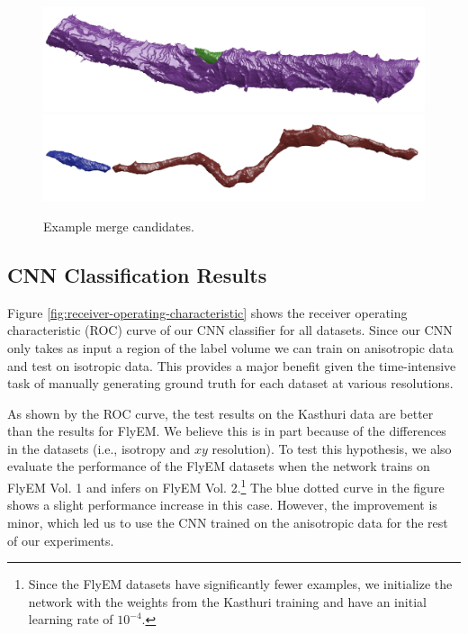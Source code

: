 \begin{figure}[h!]
	\centering
	\includegraphics[width=0.85\linewidth]{./figures/merge_candidate1.png}
	\includegraphics[width=0.85\linewidth]{./figures/merge_candidate2.png}
	\caption{Example merge candidates.}
	\label{fig:skeleton-results}
\end{figure}


\subsection{CNN Classification Results}

Figure \ref{fig:receiver-operating-characteristic} shows the receiver operating characteristic (ROC) curve of our CNN classifier for all datasets.
Since our CNN only takes as input a region of the label volume we can train on  anisotropic data and test on isotropic data.
This provides a major benefit given the time-intensive task of manually generating ground truth for each dataset at various resolutions.

As shown by the ROC curve, the test results on the Kasthuri data are better than the results for FlyEM.
We believe this is in part because of the differences in the datasets (i.e., isotropy and $xy$ resolution).
To test this hypothesis, we also evaluate the performance of the FlyEM datasets when the network trains on FlyEM Vol. 1 and infers on FlyEM Vol. 2.\footnote{Since the FlyEM datasets have significantly fewer examples, we initialize the network with the weights from the Kasthuri training and have an initial learning rate of $10^{-4}$.}
The blue dotted curve in the figure shows a slight performance increase in this case. However, the improvement is minor, which led us to use the CNN trained on the anisotropic data for the rest of our experiments.

